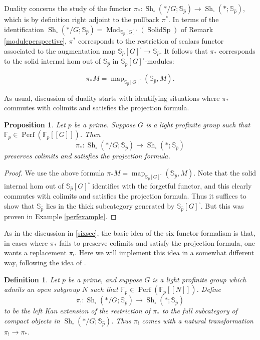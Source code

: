 \documentclass[12pt]{article}
\newtheorem{proposition}[theorem]{Proposition}
\newtheorem{definition}[theorem]{Definition}
\newcommand{\on}{\operatorname}
\newcommand{\mbb}{\mathbb}
\newcommand{\solid}{\square}
\newcommand{\wh}{\widehat}
\begin{document}
Duality concerns the study of the functor $\pi_\ast:\on{Sh}_\square(\ast/G;\mathbb{S}_{\widehat{p}})\to \on{Sh}_\square(\ast;\mathbb{S}_{\widehat{p}})$, which is by definition right adjoint to the pullback $\pi^\ast$.  In terms of the identification $\on{Sh}_\solid(\ast/G;\mbb{S}_{\widehat{p}}) = \on{Mod}_{\mbb{S}_{\widehat{p}}[G]^\solid}(\on{SolidSp})$ of Remark \ref{moduleperspective}, $\pi^\ast$ corresponds to the restriction of scalars functor associated to the augmentation map $\mathbb{S}_{\widehat{p}}[G]^\solid\to \mathbb{S}_{\widehat{p}}$.  It follows that $\pi_\ast$ corresponds to the solid internal hom out of $\mathbb{S}_{\widehat{p}}$ in $\mbb{S}_{\wh{p}}[G]^\solid$-modules:

$$\pi_\ast M = \on{map}_{\mbb{S}_{\wh{p}}[G]^\solid}(\mbb{S}_{\wh{p}},M).$$

As usual, discussion of duality starts with identifying situations where $\pi_\ast$ commutes with colimits and satisfies the projection formula.

\begin{proposition}\label{smallgood}
Let $p$ be a prime.  Suppose $G$ is a light profinite group such that $\mathbb{F}_p\in\on{Perf}(\mathbb{F}_p[[G]])$.  Then
$$\pi_\ast: \on{Sh}_\solid(\ast/G;\mbb{S}_{\wh{p}})\to\on{Sh}_\solid(\ast;\mbb{S}_{\wh{p}})$$
preserves colimits and satisfies the projection formula.
\end{proposition}
\begin{proof}
We use the above formula $\pi_\ast M = \on{map}_{\mbb{S}_{\wh{p}}[G]^\solid}(\mbb{S}_{\wh{p}},M)$.  Note that the solid internal hom out of $\mbb{S}_{\wh{p}}[G]^\square$ identifies with the forgetful functor, and this clearly commutes with colimits and satisfies the projection formula.  Thus it suffices to show that $\mathbb{S}_{\wh{p}}$ lies in the thick subcategory generated by $\mbb{S}_{\wh{p}}[G]^\square$.  But this was proven in Example \ref{perfexample}.
\end{proof}

As in the discussion in \ref{sixsec}, the basic idea of the six functor formalism is that, in cases where $\pi_\ast$ fails to preserve colimits and satisfy the projection formula, one wants a replacement $\pi_!$.  Here we will implement this idea in a somewhat different way, following the idea of \cite{KleinDualizing}.

\begin{definition}
Let $p$ be a prime, and suppose $G$ is a light profinite group which admits an open subgroup $N$ such that $\mathbb{F}_p\in \on{Perf}(\mathbb{F}_p[[N]])$.  Define
$$\pi_!:\on{Sh}_\solid(\ast/G;\mbb{S}_{\wh{p}})\to\on{Sh}_\solid(\ast;\mbb{S}_{\wh{p}})$$
to be the left Kan extension of the restriction of $\pi_\ast$ to the full subcategory of compact objects in $\on{Sh}_\solid(\ast/G;\mbb{S}_{\wh{p}})$.  Thus $\pi_!$ comes with a natural transformation $\pi_!\to \pi_\ast$.
\end{definition}
\end{document}
